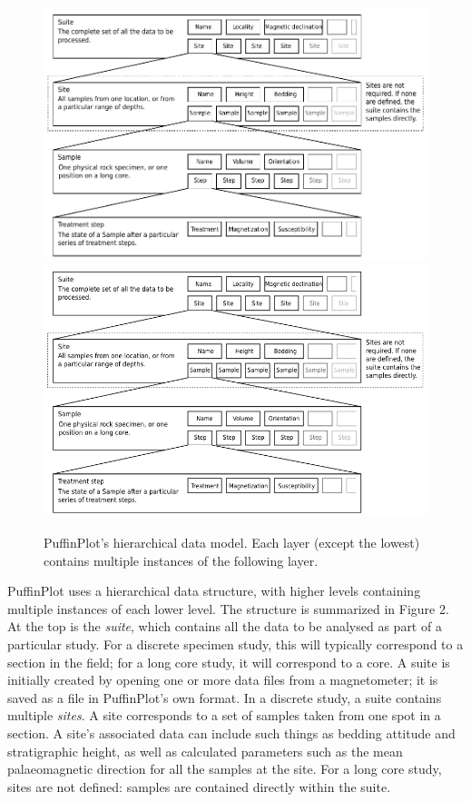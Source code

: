 \documentclass[a4paper]{article}
\begin{document}
\begin{figure}[htbp]
\centering
\ifpdf\includegraphics{figures/data-model.pdf}
\else\includegraphics{figures/data-model.png}
\fi
\caption{PuffinPlot's hierarchical data model. Each layer (except the
lowest) contains multiple instances of the following layer.}
\end{figure}

PuffinPlot uses a hierarchical data structure, with higher levels
containing multiple instances of each lower level. The structure is
summarized in Figure 2. At the top is the \emph{suite}, which contains
all the data to be analysed as part of a particular study. For a
discrete specimen study, this will typically correspond to a section in
the field; for a long core study, it will correspond to a core. A suite
is initially created by opening one or more data files from a
magnetometer; it is saved as a file in PuffinPlot's own format. In a
discrete study, a suite contains multiple \emph{sites}. A site
corresponds to a set of samples taken from one spot in a section. A
site's associated data can include such things as bedding attitude and
stratigraphic height, as well as calculated parameters such as the mean
palaeomagnetic direction for all the samples at the site. For a long
core study, sites are not defined: samples are contained directly within
the suite.
\end{document}
